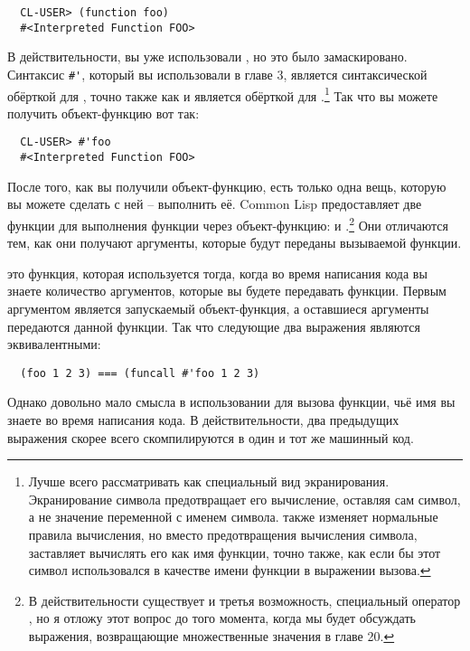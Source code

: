 \begin{verbatim}
  CL-USER> (function foo)
  #<Interpreted Function FOO>
\end{verbatim}

В действительности, вы уже использовали , но это было
замаскировано. Синтаксис \lstinline!#'!, который вы использовали в главе 3, является
синтаксической обёрткой для , точно также как и  является обёрткой
для .\footnote{Лучше всего рассматривать  как специальный вид
  экранирования.  Экранирование символа предотвращает его вычисление, оставляя сам символ,
  а не значение переменной с именем символа.  также изменяет нормальные
  правила вычисления, но вместо предотвращения вычисления символа, заставляет вычислять
  его как имя функции, точно также, как если бы этот символ использовался в качестве имени
  функции в выражении вызова.}  Так что вы можете получить объект-функцию вот так:

\begin{verbatim}
  CL-USER> #'foo
  #<Interpreted Function FOO>
\end{verbatim}

После того, как вы получили объект-функцию, есть только одна вещь, которую вы можете
сделать с ней -- выполнить её. Common Lisp предоставляет две функции для выполнения
функции через объект-функцию:  и .\footnote{В действительности
  существует и третья возможность, специальный оператор , но я
  отложу этот вопрос до того момента, когда мы будет обсуждать выражения, возвращающие
  множественные значения в главе 20.} Они отличаются тем, как они получают аргументы,
которые будут переданы вызываемой функции.

 это функция, которая используется тогда, когда во время написания кода вы
знаете количество аргументов, которые вы будете передавать функции.  Первым аргументом
 является запускаемый объект-функция, а оставшиеся аргументы передаются
данной функции.  Так что следующие два выражения являются эквивалентными:

\begin{verbatim}
  (foo 1 2 3) === (funcall #'foo 1 2 3)
\end{verbatim}

Однако довольно мало смысла в использовании  для вызова функции, чьё имя вы
знаете во время написания кода.  В действительности, два предыдущих выражения скорее всего
скомпилируются в один и тот же машинный код.

